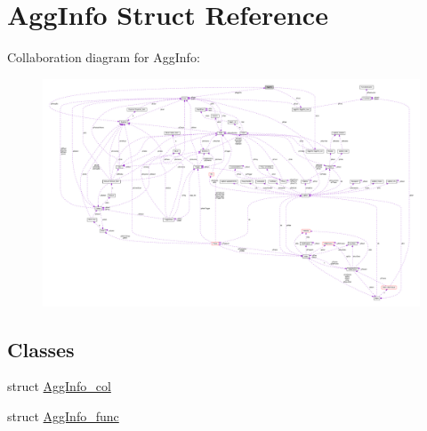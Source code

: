 \hypertarget{structAggInfo}{}\section{Agg\+Info Struct Reference}
\label{structAggInfo}


Collaboration diagram for Agg\+Info\+:\nopagebreak
\begin{figure}[H]
\begin{center}
\leavevmode
\includegraphics[width=350pt]{structAggInfo__coll__graph}
\end{center}
\end{figure}
\subsection*{Classes}
\begin{DoxyCompactItemize}
\item 
struct \hyperlink{structAggInfo_1_1AggInfo__col}{Agg\+Info\+\_\+col}
\item 
struct \hyperlink{structAggInfo_1_1AggInfo__func}{Agg\+Info\+\_\+func}
\end{DoxyCompactItemize}
